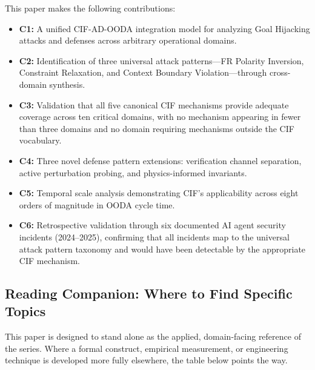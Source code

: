 \documentclass[
]{article}
\providecommand{\tightlist}{%
  \setlength{\itemsep}{0pt}\setlength{\parskip}{0pt}}
\begin{document}
This paper makes the following contributions:

\begin{itemize}
\tightlist
\item
  \textbf{C1:} A unified CIF-AD-OODA integration model for analyzing
  Goal Hijacking attacks and defenses across arbitrary operational
  domains.
\item
  \textbf{C2:} Identification of three universal attack patterns---FR
  Polarity Inversion, Constraint Relaxation, and Context Boundary
  Violation---through cross-domain synthesis.
\item
  \textbf{C3:} Validation that all five canonical CIF mechanisms provide
  adequate coverage across ten critical domains, with no mechanism
  appearing in fewer than three domains and no domain requiring
  mechanisms outside the CIF vocabulary.
\item
  \textbf{C4:} Three novel defense pattern extensions: verification
  channel separation, active perturbation probing, and physics-informed
  invariants.
\item
  \textbf{C5:} Temporal scale analysis demonstrating CIF's applicability
  across eight orders of magnitude in OODA cycle time.
\item
  \textbf{C6:} Retrospective validation through six documented AI agent
  security incidents (2024--2025), confirming that all incidents map to
  the universal attack pattern taxonomy and would have been detectable
  by the appropriate CIF mechanism.
\end{itemize}

\subsection{Reading Companion: Where to Find Specific
Topics}\label{sec:reading-companion}

This paper is designed to stand alone as the applied, domain-facing
reference of the series. Where a formal construct, empirical
measurement, or engineering technique is developed more fully elsewhere,
the table below points the way.
\end{document}
